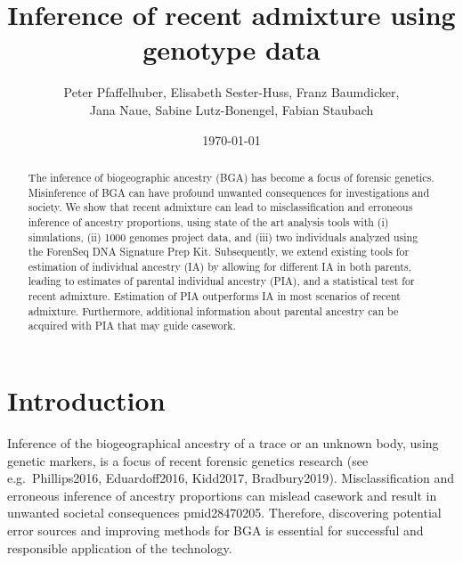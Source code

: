 \documentclass[12pt]{article}
\theoremstyle{definition}
\begin{document}
\title{\LARGE Inference of recent admixture using genotype data}

\author{\sc Peter Pfaffelhuber, Elisabeth Sester-Huss, Franz Baumdicker, \\
  \sc Jana Naue, Sabine Lutz-Bonengel, Fabian Staubach}

\date{\today}

\maketitle

\begin{abstract}
  \noindent
 The inference of biogeographic ancestry (BGA) has become a focus of forensic genetics. Misinference of BGA can have profound unwanted consequences for investigations and society. We show that recent admixture can lead to misclassification and erroneous inference of ancestry proportions, using state of the art analysis tools with (i) simulations, (ii) 1000 genomes project data, and (iii) two individuals analyzed using the ForenSeq DNA Signature Prep Kit. Subsequently, we extend existing tools for estimation of individual ancestry (IA) by allowing for different IA in both parents, leading to estimates of parental individual ancestry (PIA), and a statistical test for recent admixture. Estimation of PIA outperforms IA in most scenarios of recent admixture. Furthermore, additional information about parental ancestry can be acquired with PIA that may guide casework.
 \end{abstract}




\section{Introduction}
Inference of the biogeographical ancestry of a trace or an unknown body, using genetic markers, is a focus of recent forensic genetics research (see e.g.\ \cite{article}{Phillips2016, Eduardoff2016, Kidd2017, Bradbury2019}). Misclassification and erroneous inference of ancestry proportions can mislead casework and result in unwanted societal consequences \cite{article}{pmid28470205}. Therefore, discovering potential error sources and improving methods for BGA is essential for successful and responsible application of the technology.
\end{document}
